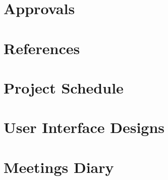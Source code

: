 \documentclass[letter,12pt]{report}
\begin{document}
\chapter{Approvals}

\chapter{References}

\appendix
\chapter{Project Schedule}
\chapter{User Interface Designs}
\chapter{Meetings Diary}
\end{document}
